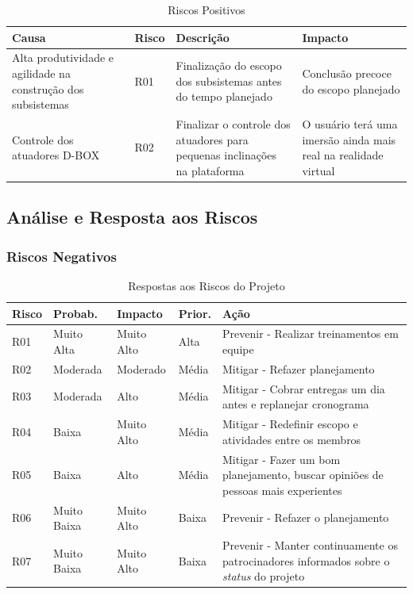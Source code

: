 \begin{table}[H]
\centering
\caption{Riscos Positivos}
\label{riscos-positivos}
\begin{tabular}{|p{4.5cm}|l|p{5cm}|p{4.5cm}|}
\hline 
\textbf{Causa} & \textbf{Risco} & \textbf{Descrição} & \textbf{Impacto} \\ \hline
Alta produtividade e agilidade na construção dos subsistemas & R01 & Finalização do escopo dos subsistemas antes do tempo planejado &
Conclusão precoce do escopo planejado \\
Controle dos atuadores D-BOX
 & R02 & Finalizar o controle dos atuadores para pequenas inclinações na plataforma & O usuário terá uma imersão ainda mais real na realidade virtual \\
\hline
\end{tabular}
\end{table}

\subsection{Análise e Resposta aos Riscos}

\subsubsection{Riscos Negativos}

\begin{table}[H]
\centering
\caption{Respostas aos Riscos do Projeto}
\label{respostas-riscos-negativos}
\begin{tabular}{|l|l|l|l|p{9cm}|}
\hline
Risco & Probab.    & Impacto    & Prior. & Ação      \\
\hline
R01 & Muito Alta & Muito Alto & Alta & Prevenir - Realizar treinamentos em equipe \\
R02 & Moderada & Moderado & Média & Mitigar - Refazer planejamento \\
R03 & Moderada & Alto & Média & Mitigar - Cobrar entregas um dia antes e replanejar cronograma \\
R04 & Baixa & Muito Alto & Média & Mitigar - Redefinir escopo e atividades entre os membros \\
R05 & Baixa & Alto & Média & Mitigar - Fazer um bom planejamento, buscar opiniões de pessoas mais experientes \\
R06 & Muito Baixa & Muito Alto & Baixa & Prevenir - Refazer o planejamento \\
R07 & Muito Baixa & Muito Alto & Baixa & Prevenir - Manter continuamente os patrocinadores informados sobre o \textit{status} do projeto \\
\hline
\end{tabular}
\end{table}

